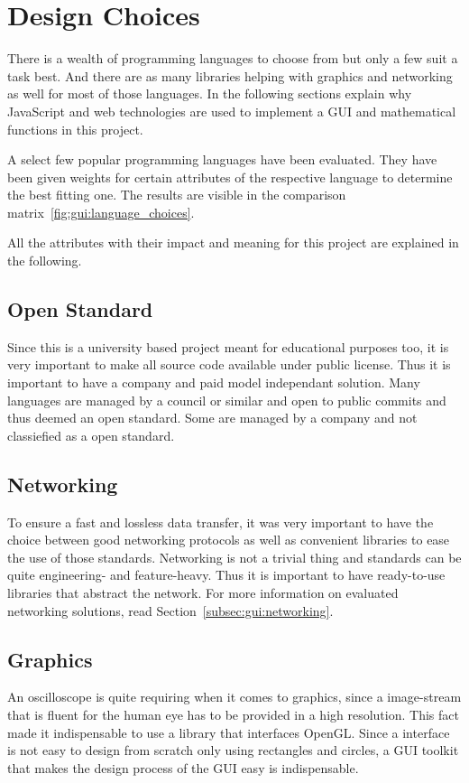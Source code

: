 \section{Design Choices}
\label{sec:gui:design_choices}

There is a wealth of programming languages to choose from but only a few suit a task best. And there are as many libraries helping with graphics and networking as well for most of those languages.
In the following sections explain why JavaScript and web technologies are used to implement a GUI and mathematical functions in this project.

A select few popular programming languages have been evaluated. They have been given weights for certain attributes of the respective language to determine the best fitting one. The results are visible in the comparison matrix~\ref{fig:gui:language_choices}.

All the attributes with their impact and meaning for this project are explained in the following.

\subsection*{Open Standard} Since this is a university based project meant for educational purposes too, it is very important to make all source code available under public license. Thus it is important to have a company and paid model independant solution. Many languages are managed by a council or similar and open to public commits and thus deemed an open standard. Some are managed by a company and not classiefied as a open standard.

\subsection*{Networking} To ensure a fast and lossless data transfer, it was very important to have the choice between good networking protocols as well as convenient libraries to ease the use of those standards.
Networking is not a trivial thing and standards can be quite engineering- and feature-heavy. Thus it is important to have ready-to-use libraries that abstract the network. For more information on evaluated networking solutions, read Section~\ref{subsec:gui:networking}.

\subsection*{Graphics} An oscilloscope is quite requiring when it comes to graphics, since a image-stream that is fluent for the human eye has to be provided in a high resolution. This fact made it indispensable to use a library that interfaces OpenGL. Since a interface is not easy to design from scratch only using rectangles and circles, a GUI toolkit that makes the design process of the GUI easy is indispensable.

